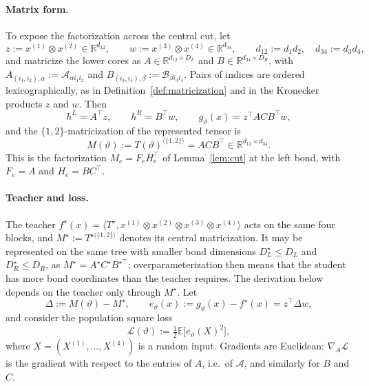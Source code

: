 \documentclass[11pt]{article}
\newcommand{\R}{\mathbb{R}}
\newcommand{\E}{\mathbb{E}}
\newcommand{\ip}[2]{\langle #1,#2\rangle}
\theoremstyle{definition}
\numberwithin{equation}{section}
\begin{document}
\paragraph{Matrix form.}
To expose the factorization across the central cut, let
\[
z:=x^{(1)}\otimes x^{(2)}\in\R^{d_{12}},\qquad w:=x^{(3)}\otimes x^{(4)}\in\R^{d_{34}},\qquad d_{12}:=d_1d_2,\quad d_{34}:=d_3d_4,
\]
and matricize the lower cores as $A\in\R^{d_{12}\times D_L}$ and $B\in\R^{d_{34}\times D_R}$, with $A_{(i_1,i_2),\alpha}:=\mathcal A_{\alpha i_1i_2}$ and $B_{(i_3,i_4),\beta}:=\mathcal B_{\beta i_3i_4}$. Pairs of indices are ordered lexicographically, as in Definition~\ref{def:matricization} and in the Kronecker products $z$ and $w$. Then
\begin{equation}\label{eq:d2-matrix-forward}
h^L=A^\top z,\qquad h^R=B^\top w,\qquad g_\vartheta(x)=z^\top ACB^\top w,
\end{equation}
and the $\{1,2\}$-matricization of the represented tensor is
\begin{equation}\label{eq:d2-matricization}
M(\vartheta):=T(\vartheta)^{\langle\{1,2\}\rangle}=ACB^\top\in\R^{d_{12}\times d_{34}}.
\end{equation}
This is the factorization $M_e=F_eH_e^\top$ of Lemma~\ref{lem:cut} at the left bond, with $F_e=A$ and $H_e=BC^\top$.

\paragraph{Teacher and loss.}
The teacher $f^\star(x)=\ip{T^\star}{x^{(1)}\otimes x^{(2)}\otimes x^{(3)}\otimes x^{(4)}}$ acts on the same four blocks, and $M^\star:=T^{\star\langle\{1,2\}\rangle}$ denotes its central matricization. It may be represented on the same tree with smaller bond dimensions $D^\star_L\le D_L$ and $D^\star_R\le D_R$, as $M^\star=A^\star C^\star B^{\star\top}$; overparameterization then means that the student has more bond coordinates than the teacher requires. The derivation below depends on the teacher only through $M^\star$. Let
\begin{equation}\label{eq:d2-errors}
\Delta:=M(\vartheta)-M^\star,\qquad e_\vartheta(x):=g_\vartheta(x)-f^\star(x)=z^\top\Delta w,
\end{equation}
and consider the population square loss
\begin{equation}\label{eq:d2-loss-def}
\mathcal L(\vartheta):=\tfrac12\E\big[e_\vartheta(X)^2\big],
\end{equation}
where $X=(X^{(1)},\dots,X^{(4)})$ is a random input. Gradients are Euclidean: $\nabla_A\mathcal L$ is the gradient with respect to the entries of $A$, i.e.\ of $\mathcal A$, and similarly for $B$ and $C$.
\end{document}
